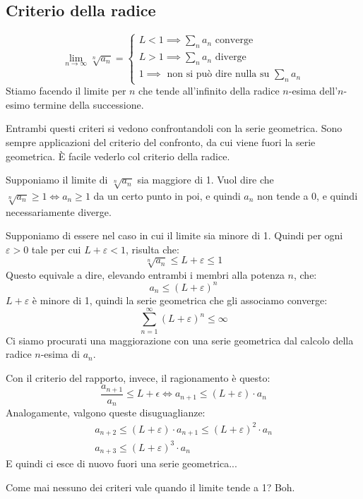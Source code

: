 \subsection{Criterio della radice}

\[
\lim_{n \to \infty} \sqrt[n]{a_n} = 
\begin{cases}
L < 1 \implies \sum_{n} a_n \text{ converge} \\
L > 1 \implies \sum_{n} a_n \text{ diverge} \\
1 \implies \text{ non si pu\`o dire nulla su } \sum_{n} a_n
\end{cases}
\]
Stiamo facendo il limite per $n$ che tende all'infinito della radice $n$-esima dell'$n$-esimo termine della successione.

Entrambi questi criteri si vedono confrontandoli con la serie geometrica. Sono sempre applicazioni del criterio del confronto, da cui viene fuori la serie geometrica. \`E facile vederlo col criterio della radice.

Supponiamo il limite di $\sqrt[n]{a_n}$ sia maggiore di 1. Vuol dire che $\sqrt[n]{a_n} \ge 1 \iff a_n \ge 1$ da un certo punto in poi, e quindi $a_n$ non tende a 0, e quindi necessariamente diverge.

Supponiamo di essere nel caso in cui il limite sia minore di 1. Quindi per ogni $\varepsilon > 0$ tale per cui $L + \varepsilon < 1$, risulta che:
\[
\sqrt[n]{a_n} \le L + \varepsilon \le 1
\]
Questo equivale a dire, elevando entrambi i membri alla potenza $n$, che:
\[
a_n \le \left( L + \varepsilon \right)^{n}
\]
$L + \varepsilon$ \`e minore di 1, quindi la serie geometrica che gli associamo converge:
\[
\sum_{n = 1}^{\infty} \left( L + \varepsilon \right)^{n} \le \infty
\]
Ci siamo procurati una maggiorazione con una serie geometrica dal calcolo della radice $n$-esima di $a_n$.

Con il criterio del rapporto, invece, il ragionamento \`e questo:
\[
\frac{a_{n+1}}{a_n} \le L + \epsilon \iff a_{n+1} \le \left( L + \varepsilon \right) \cdot a_n
\]
Analogamente, valgono queste disuguaglianze:
\begin{align*}
a_{n+2} \le \left( L + \varepsilon \right) \cdot a_{n + 1} \le
\left( L + \varepsilon \right)^2 \cdot a_{n} \\
a_{n+3} \le \left( L + \varepsilon \right)^3 \cdot a_{n}
\end{align*}
E quindi ci esce di nuovo fuori una serie geometrica...

Come mai nessuno dei criteri vale quando il limite tende a 1? Boh.


